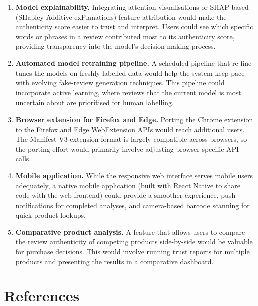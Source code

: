 \documentclass[12pt,a4paper,oneside]{report}
\newif\ifreferencepage
\begin{document}
\begin{enumerate}[leftmargin=*]
  \item \textbf{Model explainability.} Integrating attention
        visualisations or SHAP-based (SHapley Additive exPlanations)
        feature attribution would make the authenticity score easier to
        trust and interpret. Users could see which specific words or
        phrases in a review contributed most to its authenticity score,
        providing transparency into the model's decision-making process.

  \item \textbf{Automated model retraining pipeline.} A scheduled
        pipeline that re-fine-tunes the models on freshly labelled data
        would help the system keep pace with evolving fake-review
        generation techniques. This pipeline could incorporate active
        learning, where reviews that the current model is most uncertain
        about are prioritised for human labelling.

  \item \textbf{Browser extension for Firefox and Edge.} Porting the
        Chrome extension to the Firefox and Edge WebExtension APIs
        would reach additional users. The Manifest V3 extension format
        is largely compatible across browsers, so the porting effort
        would primarily involve adjusting browser-specific API calls.

  \item \textbf{Mobile application.} While the responsive web interface
        serves mobile users adequately, a native mobile application
        (built with React Native to share code with the web frontend)
        could provide a smoother experience, push notifications for
        completed analyses, and camera-based barcode scanning for quick
        product lookups.

  \item \textbf{Comparative product analysis.} A feature that allows
        users to compare the review authenticity of competing products
        side-by-side would be valuable for purchase decisions. This would
        involve running trust reports for multiple products and presenting
        the results in a comparative dashboard.
\end{enumerate}

\referencepagetrue        %
\chapter*{References}
\thispagestyle{referencefancy}
\end{document}

